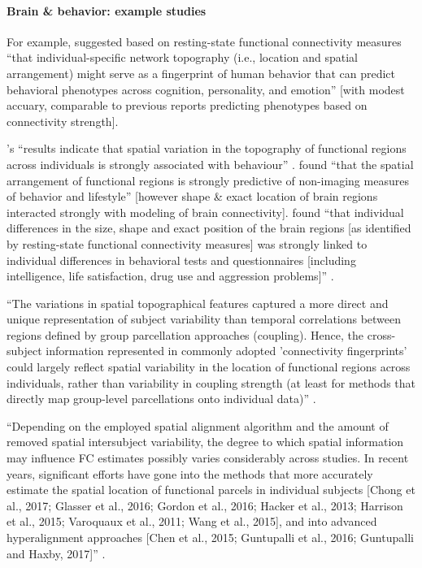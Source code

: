\paragraph{Brain \& behavior: example studies}


%
For example, \citet{kong2019spatial} suggested based on resting-state functional
connectivity measures ``that individual-specific network topography (i.e.,
location and spatial arrangement) might serve as a fingerprint of human behavior
that can predict behavioral phenotypes across cognition, personality, and
emotion'' \citep{kong2019spatial} [with modest accuary, comparable to previous
reports predicting phenotypes based on connectivity strength].

%
\citep{bijsterbosch2018relationship}'s ``results indicate that spatial variation
in the topography of functional regions across individuals is strongly
associated with behaviour'' \citep{bijsterbosch2018relationship}.
%
\citet{bijsterbosch2018relationship} found ``that the spatial arrangement of
functional regions is strongly predictive of non-imaging measures of behavior
and lifestyle'' [however shape \& exact location of brain regions interacted
strongly with  modeling of brain connectivity].
%
\citet{bijsterbosch2018relationship} found ``that individual differences in the
size, shape and exact position of the brain regions [as identified by
resting-state functional connectivity measures] was strongly linked to
individual differences in behavioral tests and questionnaires [including
intelligence, life satisfaction, drug use and aggression problems]''
\citep{bijsterbosch2018relationship}.

%
``The variations in spatial topographical features captured a more direct and
unique representation of subject variability than temporal correlations between
regions defined by group parcellation approaches (coupling).
%
Hence, the cross-subject information represented in commonly adopted
'connectivity fingerprints' could largely reflect spatial variability in the
location of functional regions across individuals, rather than variability in
coupling strength (at least for methods that directly map group-level
parcellations onto individual data)'' \citep{bijsterbosch2018relationship}.

%
``Depending on the employed spatial alignment algorithm and the amount of
removed spatial intersubject variability, the degree to which spatial
information may influence FC estimates possibly varies considerably across
studies.
%
In recent years, significant efforts have gone into the methods that more
accurately estimate the spatial location of functional parcels in individual
subjects [Chong et al., 2017; Glasser et al., 2016; Gordon et al., 2016; Hacker
et al., 2013; Harrison et al., 2015; Varoquaux et al., 2011; Wang et al., 2015],
and into advanced hyperalignment approaches [Chen et al., 2015; Guntupalli et
al., 2016; Guntupalli and Haxby, 2017]'' \citep{bijsterbosch2018relationship}.


